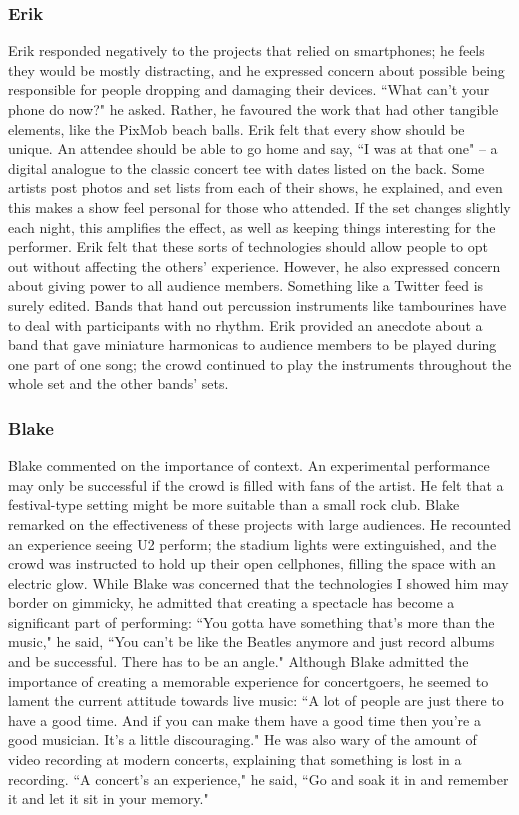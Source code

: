 \subsubsection{Erik}
Erik responded negatively to the projects that relied on smartphones; he feels they would be mostly distracting, and he expressed concern about possible being responsible for people dropping and damaging their devices. ``What can't your phone do now?" he asked. Rather, he favoured the work that had other tangible elements, like the PixMob beach balls. Erik felt that every show should be unique. An attendee should be able to go home and say, ``I was at that one" -- a digital analogue to the classic concert tee with dates listed on the back. Some artists post photos and set lists from each of their shows, he explained, and even this makes a show feel personal for those who attended. If the set changes slightly each night, this amplifies the effect, as well as keeping things interesting for the performer. Erik felt that these sorts of technologies should allow people to opt out without affecting the others' experience. However, he also expressed concern about giving power to all audience members. Something like a Twitter feed is surely edited. Bands that hand out percussion instruments like tambourines have to deal with participants with no rhythm. Erik provided an anecdote about a band that gave miniature harmonicas to audience members to be played during one part of one song; the crowd continued to play the instruments throughout the whole set and the other bands' sets.

\subsubsection{Blake}
Blake commented on the importance of context. An experimental performance may only be successful if the crowd is filled with fans of the artist. He felt that a festival-type setting might be more suitable than a small rock club. Blake remarked on the effectiveness of these projects with large audiences. He recounted an experience seeing U2 perform; the stadium lights were extinguished, and the crowd was instructed to hold up their open cellphones, filling the space with an electric glow. While Blake was concerned that the technologies I showed him may border on gimmicky, he admitted that creating a spectacle has become a significant part of performing: ``You gotta have something that's more than the music," he said, ``You can't be like the Beatles anymore and just record albums and be successful. There has to be an angle." Although Blake admitted the importance of creating a memorable experience for concertgoers, he seemed to lament the current attitude towards live music: ``A lot of people are just there to have a good time. And if you can make them have a good time then you're a good musician. It's a little discouraging." He was also wary of the amount of video recording at modern concerts, explaining that something is lost in a recording. ``A concert's an experience," he said, ``Go and soak it in and remember it and let it sit in your memory."

